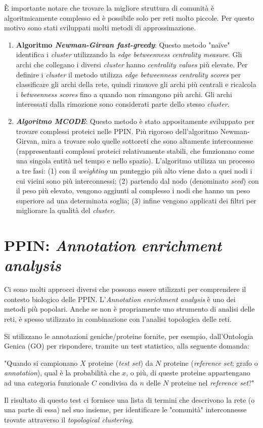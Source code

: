 \documentclass[11pt]{article}
\begin{document}
È importante notare che trovare la migliore struttura di comunità è algoritmicamente complesso ed è possibile solo per reti molto piccole. Per questo motivo sono stati sviluppati molti metodi di approssimazione.
\begin{enumerate}
\item \textbf{Algoritmo \textit{Newman-Girvan fast-greedy}}: Questo metodo "naïve" identifica i \textit{cluster} utilizzando la \textit{edge betweenness centrality measure}. Gli archi che collegano i diversi \textit{cluster} hanno \textit{centrality values} più elevate. Per definire i \textit{cluster} il metodo utilizza \textit{edge betweenness centrality scores} per classificare gli archi della rete, quindi rimuove gli archi più centrali e ricalcola i \textit{betweenness scores} fino a quando non rimangono più archi. Gli archi interessati dalla rimozione sono considerati parte dello stesso \textit{cluster}.
\item \textit{\textbf{Algoritmo MCODE}}: Questo metodo è stato appositamente sviluppato per trovare complessi proteici nelle PPIN. Più rigoroso dell'algoritmo Newman-Girvan, mira a trovare solo quelle sottoreti che sono altamente interconnesse (rappresentanti complessi proteici relativamente stabili, che funzionano come una singola entità nel tempo e nello spazio).
L'algoritmo utilizza un processo a tre fasi: (1) con il \textit{weighting} un punteggio più alto viene dato a quei nodi i cui vicini sono più interconnessi; (2) partendo dal nodo (denominato \textit{seed}) con il peso più elevato, vengono aggiunti al complesso i nodi che hanno un peso superiore ad una determinata soglia; (3) infine vengono applicati dei filtri per migliorare la qualità del \textit{cluster}.
\end{enumerate}

\section{PPIN: \textit{Annotation enrichment analysis}}
Ci sono molti approcci diversi che possono essere utilizzati per comprendere il contesto biologico delle PPIN. L'\textit{Annotation enrichment analysis} è uno dei metodi più popolari. Anche se non è propriamente uno strumento di analisi delle reti, è spesso utilizzato in combinazione con l'analisi topologica delle reti.

Si utilizzano le annotazioni geniche/proteine fornite, per esempio, dall'Ontologia Genica (GO) per rispondere, tramite un test statistico, alla seguente domanda:
\begin{center}
"Quando si campionano $X$ proteine (\textit{test set}) da $N$ proteine (\textit{reference set}; grafo o \textit{annotation}), qual è la probabilità che $x$, o più, di queste proteine appartengano ad una categoria funzionale $C$ condivisa da $n$ delle $N$ proteine nel \textit{reference set}?"
\end{center}
Il risultato di questo test ci fornisce una lista di termini che descrivono la rete (o una parte di essa) nel suo insieme, per identificare le "comunità" interconnesse trovate attraverso il \textit{topological clustering}.
\end{document}
